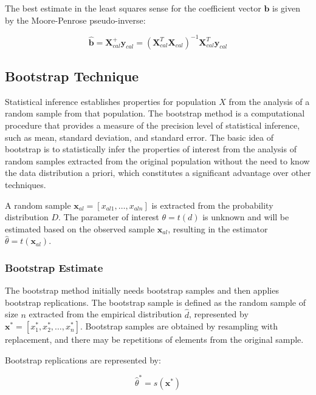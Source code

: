 \documentclass[12pt]{article}
\begin{document}
The best estimate in the least squares sense for the coefficient vector $\mathbf{b}$ is given by the Moore-Penrose pseudo-inverse:

\begin{equation}
\hat{\mathbf{b}} = \mathbf{X}^+_{cal}\mathbf{y}_{cal} = (\mathbf{X}^T_{cal}\mathbf{X}_{cal})^{-1}\mathbf{X}^T_{cal}\mathbf{y}_{cal}
\end{equation}

\subsection{Bootstrap Technique}

Statistical inference establishes properties for population $X$ from the analysis of a random sample from that population.\cite{DRAPER:1998, JOHNSON:2001, CHATTERJEE:2006} The bootstrap method is a computational procedure that provides a measure of the precision level of statistical inference, such as mean, standard deviation, and standard error.\cite{DRAPER:1998} The basic idea of bootstrap is to statistically infer the properties of interest from the analysis of random samples extracted from the original population without the need to know the data distribution a priori, which constitutes a significant advantage over other techniques.

A random sample $\mathbf{x}_{al} = [x_{al1}, \ldots, x_{aln}]$ is extracted from the probability distribution $D$. The parameter of interest $\theta = t(d)$ is unknown and will be estimated based on the observed sample $\mathbf{x}_{al}$, resulting in the estimator $\hat{\theta} = t(\mathbf{x}_{al})$.

\subsubsection{Bootstrap Estimate}

The bootstrap method initially needs bootstrap samples and then applies bootstrap replications. The bootstrap sample is defined as the random sample of size $n$ extracted from the empirical distribution $\hat{d}$, represented by $\mathbf{x}^* = [x^*_1, x^*_2, \ldots, x^*_n]$.\cite{EFRON:1994} Bootstrap samples are obtained by resampling with replacement, and there may be repetitions of elements from the original sample.

Bootstrap replications are represented by:

\begin{equation}
\hat{\theta}^* = s(\mathbf{x}^*)
\end{equation}
\end{document}

